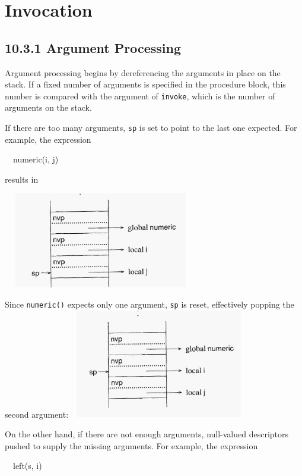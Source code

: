 \section{Invocation}
\subsection[10.3.1 Argument Processing]{10.3.1 Argument Processing}

Argument processing begins by dereferencing the arguments in place on
the stack. If a fixed number of arguments is specified in the
procedure block, this number is compared with the argument of
\texttt{invoke}, which is the number of arguments on the stack.


If there are too many arguments, \texttt{sp} is set to point to the
last one expected. For example, the expression

{\ttfamily\mdseries
\ \ numeric(i, j)}

\noindent results in

\bigskip

\ \  \includegraphics[width=3.0984in,height=1.6457in]{ib-img/ib-img080.jpg} 


Since \texttt{numeric()} expects only one argument, \texttt{sp} is reset, effectively popping the second argument:\ \ 
\includegraphics[width=2.8846in,height=1.8728in]{ib-img/ib-img081.jpg} 

On the other hand, if there are not enough arguments, null-valued
descriptors pushed to supply the missing arguments.  For example, the
expression

{\ttfamily\mdseries
\ \ left(s, i)}

